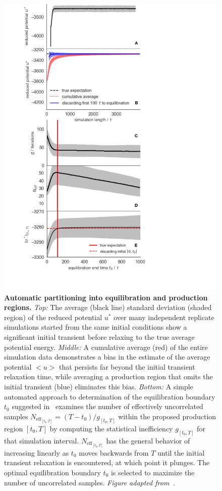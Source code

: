 \documentclass[9pt,bestpractices]{livecoms}
\begin{document}
\begin{figure}
    \centering
    \includegraphics[width=0.95\linewidth]{paper/figures/fig10_equib_detection/fig10_equib.pdf}
    \caption{{\bf Automatic partitioning into equilibration and production regions.}
    \emph{Top:} The average (black line) standard deviation (shaded region) of the reduced potential $u^*$ over many independent replicate simulations started from the same initial conditions show a significant initial transient before relaxing to the true average potential energy.
    \emph{Middle:} A cumulative average (red) of the entire simulation data demonstrates a bias in the estimate of the average potential $<u>$ that persists far beyond the initial transient relaxation time, while averaging a production region that omits the initial transient (blue) eliminates this bias.
    \emph{Bottom:} A simple automated approach to determination of the equilibration boundary $t_0$ suggested in~\cite{chodera2016simple} examines the number of effectively uncorrelated samples $N_{\mathrm{eff}_{[t_0,T]}} = (T-t_0) / g_{[t_0,T]}$ within the proposed production region $[t_0,T]$ by computing the statistical inefficiency $g_{[t_0,T]}$ for that simulation interval.
    $N_{\mathrm{eff}_{[t_0,T]}}$ has the general behavior of increasing linearly as $t_0$ moves backwards from $T$ until the initial transient relaxation is encountered, at which point it plunges.
    The optimal equilibration boundary $t_0$ is selected to maximize the number of uncorrelated samples.
    \emph{Figure adapted from~\cite{chodera2016simple}.}
    }
    \label{fig:automatic-equilibration-detection}
\end{figure}
\end{document}
